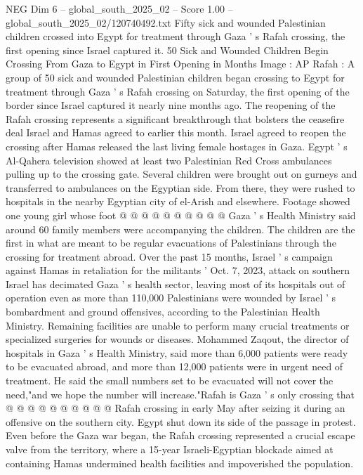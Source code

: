 \begin{textsample}{NEG Dim 6 – global\_south\_2025\_02 – Score 1.00 – global\_south\_2025\_02/120740492.txt}  \label{ex:f6_neg_042}
Fifty sick and wounded Palestinian children crossed into Egypt for treatment through Gaza ' s Rafah crossing, the first opening since Israel captured it. 50 Sick and Wounded Children Begin Crossing From Gaza to Egypt in First Opening in Months Image : AP Rafah : A group of 50 sick and wounded Palestinian children began crossing to Egypt for treatment through Gaza ' s Rafah crossing on Saturday, the first opening of the border since Israel captured it nearly nine months ago.
The reopening of the Rafah crossing represents a significant breakthrough that bolsters the ceasefire deal Israel and Hamas agreed to earlier this month.
Israel agreed to reopen the crossing after Hamas released the last living female hostages in Gaza.
Egypt ' s Al-Qahera television showed at least two Palestinian Red Cross ambulances pulling up to the crossing gate.
Several children were brought out on gurneys and transferred to ambulances on the Egyptian side.
From there, they were rushed to hospitals in the nearby Egyptian city of el-Arish and elsewhere.
Footage showed one young girl whose foot @ @ @ @ @ @ @ @ @ @ Gaza ' s Health Ministry said around 60 family members were accompanying the children.
The children are the first in what are meant to be regular evacuations of Palestinians through the crossing for treatment abroad.
Over the past 15 months, Israel ' s campaign against Hamas in retaliation for the militants ' Oct. 7, 2023, attack on southern Israel has decimated Gaza ' s health sector, leaving most of its hospitals out of operation even as more than 110,000 Palestinians were wounded by Israel ' s bombardment and ground offensives, according to the Palestinian Health Ministry.
Remaining facilities are unable to perform many crucial treatments or specialized surgeries for wounds or diseases.
Mohammed Zaqout, the director of hospitals in Gaza ' s Health Ministry, said more than 6,000 patients were ready to be evacuated abroad, and more than 12,000 patients were in urgent need of treatment.
He said the small numbers set to be evacuated will not cover the need,"and we hope the number will increase."Rafah is Gaza ' s only crossing that @ @ @ @ @ @ @ @ @ @ Rafah crossing in early May after seizing it during an offensive on the southern city.
Egypt shut down its side of the passage in protest.
Even before the Gaza war began, the Rafah crossing represented a crucial escape valve from the territory, where a 15-year Israeli-Egyptian blockade aimed at containing Hamas undermined health facilities and impoverished the population.

\end{textsample}
